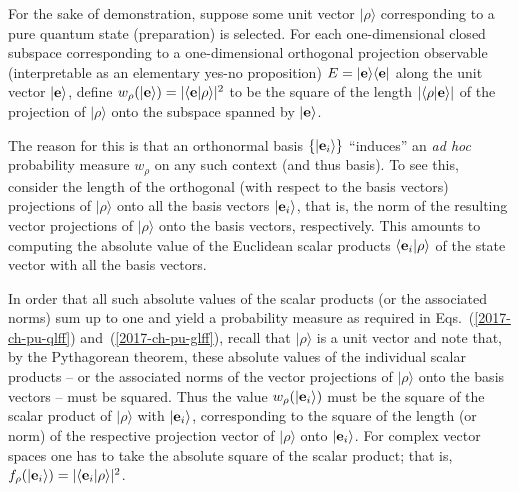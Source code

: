 For the sake of demonstration, suppose some unit vector $\vert \rho \rangle$ corresponding to a pure quantum state (preparation) is selected.
For each one-dimensional closed subspace corresponding
to a one-dimensional orthogonal projection observable (interpretable as an elementary yes-no proposition)
$E=\vert {\bf e}\rangle \langle {\bf e} \vert$
along the unit vector $\vert {\bf e}\rangle$,
define
$w_\rho(\vert {\bf e}\rangle ) =  \vert \langle {\bf e} \vert  \rho \rangle \vert^2$
to be the  square of the length $\vert \langle \rho \vert {\bf e} \rangle \vert$ of the
projection of $\vert \rho \rangle$ onto the subspace spanned by $\vert {\bf e}\rangle$.



The reason for this is that an orthonormal
basis $\{  \vert  {\bf e}_i \rangle   \}$ ``induces''
an {\it ad hoc}  probability measure $w_\rho $
on any such context (and thus basis).
To see this,
consider the length  of
the orthogonal (with respect to the basis vectors)
projections of $\vert  \rho \rangle$
onto all the basis vectors $\vert  {\bf e}_i \rangle$,
that is, the norm of the resulting vector projections of $\vert \rho \rangle$ onto the basis vectors,
respectively.
This amounts to computing the absolute value of the Euclidean scalar products
$\langle  {\bf e}_i \vert  \rho \rangle$
of the state vector with all the basis vectors.


In order that all such  absolute values of the scalar products (or the associated norms)
sum up to one and yield a probability measure as required in Eqs.~(\ref{2017-ch-pu-qlff}) and~(\ref{2017-ch-pu-glff}),
recall that $\vert  \rho \rangle$ is a unit vector
and note that, by the Pythagorean theorem,
these  absolute values of the individual scalar products
-- or the associated norms of the vector projections of $\vert \rho \rangle$ onto the basis vectors --
must be squared.
Thus the value $w_\rho(\vert {\bf e}_i\rangle )$
must be the square of the scalar product of $\vert  \rho \rangle$
with $\vert  {\bf e}_i \rangle$,
corresponding to the square of the length (or norm) of
the respective projection vector of $\vert  \rho \rangle$ onto  $\vert  {\bf e}_i \rangle$.
For complex vector spaces one has to take the absolute square of the scalar product;
that is, $f_\rho (  \vert  {\bf e}_i \rangle   ) = \vert \langle  {\bf e}_i \vert  \rho \rangle \vert ^2$.

